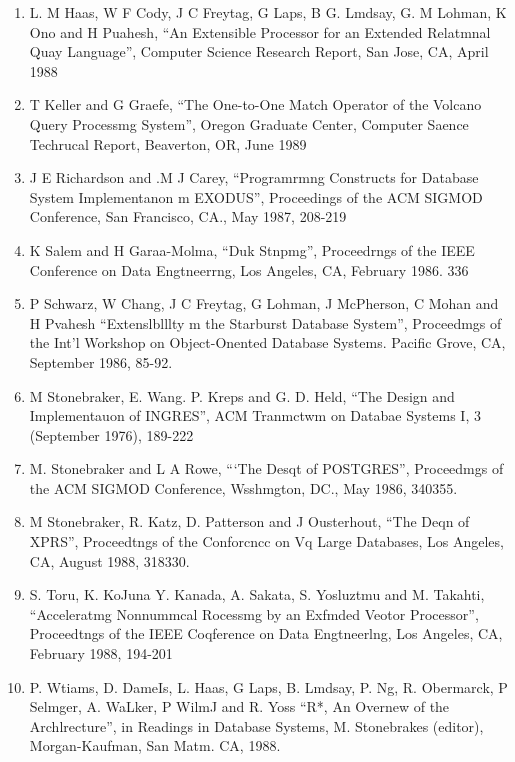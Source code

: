 \documentclass[a4paper,11pt,notitlepage,twoside,openright]{article}
\begin{document}
\begin{enumerate}
  \item
  L. M Haas, W F Cody, J C Freytag, G Laps, B
  G. Lmdsay, G. M Lohman, K Ono and H Puahesh,
  “An Extensible Processor for an Extended Relatmnal
  Quay Language”, Computer Science Research
  Report, San Jose, CA, April 1988
  \item
  T Keller and G Graefe, “The One-to-One Match
  Operator of the Volcano Query Processmg System”,
  Oregon Graduate Center, Computer Saence Techrucal
  Report, Beaverton, OR, June 1989
  \item
  J E Richardson and .M J Carey, “Programrmng
  Constructs for Database System Implementanon m
  EXODUS”, Proceedings of the ACM SIGMOD
  Conference, San Francisco, CA., May 1987, 208-219
  \item
  K Salem and H Garaa-Molma, “Duk Stnpmg”,
  Proceedrngs of the IEEE Conference on Data
  Engtneerrng, Los Angeles, CA, February 1986. 336
  \item
  P Schwarz, W Chang, J C Freytag, G Lohman, J
  McPherson, C Mohan and H Pvahesh “Extenslblllty
  m the Starburst Database System”, Proceedmgs of
  the Int’l Workshop on Object-Onented Database
  Systems. Pacific Grove, CA, September 1986, 85-92.
  \item
  M Stonebraker, E. Wang. P. Kreps and G. D. Held,
  “The Design and Implementauon of INGRES”, ACM
  Tranmctwm on Databae Systems I, 3 (September
  1976), 189-222
  \item
  M. Stonebraker and L A Rowe, “‘The Desqt of
  POSTGRES”, Proceedmgs of the ACM SIGMOD
  Conference, Wsshmgton, DC., May 1986, 340355.
  \item
  M Stonebraker, R. Katz, D. Patterson and J
  Ousterhout, “The Deqn of XPRS”, Proceedtngs of
  the Conforcncc on Vq Large Databases, Los
  Angeles, CA, August 1988, 318330.
  \item
  S. Toru, K. KoJuna Y. Kanada, A. Sakata, S.
  Yosluztmu and M. Takahti, “Acceleratmg
  Nonnummcal Rocessmg by an Exfmded Veotor
  Processor”, Proceedtngs of the IEEE Coqference on
  Data Engtneerlng, Los Angeles, CA, February 1988,
  194-201
  \item
  P. Wtiams, D. DameIs, L. Haas, G Laps, B.
  Lmdsay, P. Ng, R. Obermarck, P Selmger, A.
  WaLker, P WilmJ and R. Yoss “R*, An Overnew
  of the Archlrecture”, in Readings in Database
  Systems, M. Stonebrakes (editor), Morgan-Kaufman,
  San Matm. CA, 1988.
\end{enumerate}
\end{document}
